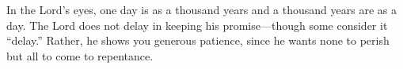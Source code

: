 
\lettrine{I}{}n the Lord’s eyes, one day is as a thousand years and a thousand years are as a day. The Lord does not delay in keeping his promise—though some consider it “delay.” Rather, he shows you generous patience, since he wants none to perish but all to come to repentance.